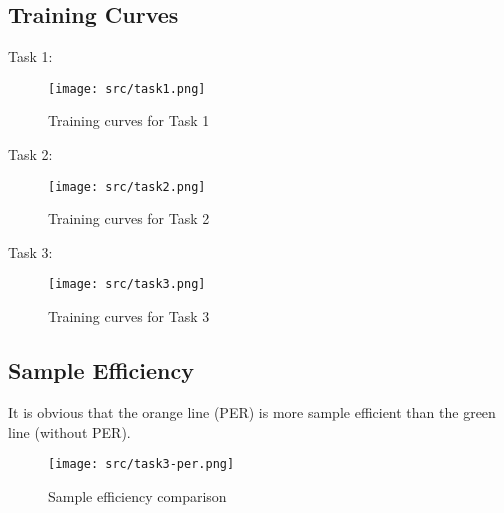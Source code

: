 \subsection{Training Curves}

Task 1:

\begin{figure}[H]
    \centering
    \texttt{[image: src/task1.png]}
    \caption{Training curves for Task 1}
    \label{fig:task1_training_curves}
\end{figure}

Task 2:

\begin{figure}[H]
    \centering
    \texttt{[image: src/task2.png]}
    \caption{Training curves for Task 2}
    \label{fig:task2_training_curves}
\end{figure}

Task 3:

\begin{figure}[H]
    \centering
    \texttt{[image: src/task3.png]}
    \caption{Training curves for Task 3}
    \label{fig:task3_training_curves}
\end{figure}


\subsection{Sample Efficiency}

It is obvious that the orange line (PER) is more sample efficient than the green line (without PER).

\begin{figure}[H]
    \centering
    \texttt{[image: src/task3-per.png]}
    \caption{Sample efficiency comparison}
    \label{fig:sample_efficiency}
\end{figure}
